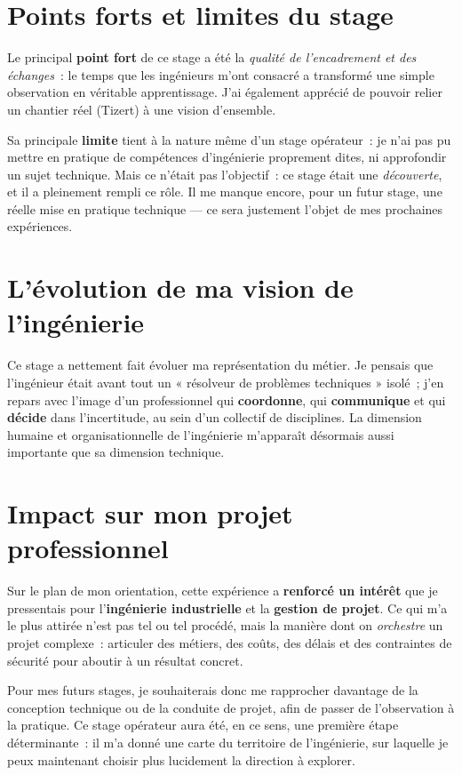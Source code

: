 \section{Points forts et limites du stage}

Le principal \textbf{point fort} de ce stage a été la \emph{qualité de l'encadrement et des échanges}~: le temps que les ingénieurs m'ont consacré a transformé une simple observation en véritable apprentissage. J'ai également apprécié de pouvoir relier un chantier réel (Tizert) à une vision d'ensemble.

Sa principale \textbf{limite} tient à la nature même d'un stage opérateur~: je n'ai pas pu mettre en pratique de compétences d'ingénierie proprement dites, ni approfondir un sujet technique. Mais ce n'était pas l'objectif~: ce stage était une \emph{découverte}, et il a pleinement rempli ce rôle. Il me manque encore, pour un futur stage, une réelle mise en pratique technique --- ce sera justement l'objet de mes prochaines expériences.

\section{L'évolution de ma vision de l'ingénierie}

Ce stage a nettement fait évoluer ma représentation du métier. Je pensais que l'ingénieur était avant tout un « résolveur de problèmes techniques » isolé~; j'en repars avec l'image d'un professionnel qui \textbf{coordonne}, qui \textbf{communique} et qui \textbf{décide} dans l'incertitude, au sein d'un collectif de disciplines. La dimension humaine et organisationnelle de l'ingénierie m'apparaît désormais aussi importante que sa dimension technique.

\section{Impact sur mon projet professionnel}

Sur le plan de mon orientation, cette expérience a \textbf{renforcé un intérêt} que je pressentais pour l'\textbf{ingénierie industrielle} et la \textbf{gestion de projet}. Ce qui m'a le plus attirée n'est pas tel ou tel procédé, mais la manière dont on \emph{orchestre} un projet complexe~: articuler des métiers, des coûts, des délais et des contraintes de sécurité pour aboutir à un résultat concret.

Pour mes futurs stages, je souhaiterais donc me rapprocher davantage de la conception technique ou de la conduite de projet, afin de passer de l'observation à la pratique. Ce stage opérateur aura été, en ce sens, une première étape déterminante~: il m'a donné une carte du territoire de l'ingénierie, sur laquelle je peux maintenant choisir plus lucidement la direction à explorer.
